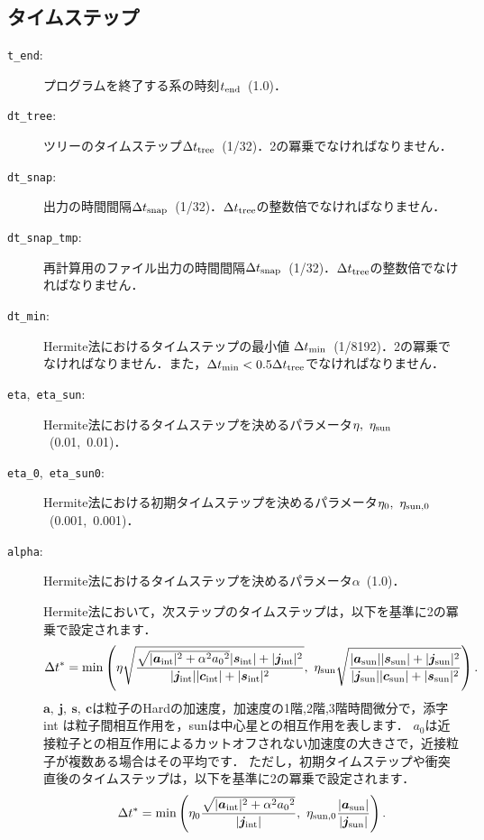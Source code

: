 \documentclass[12pt,a4paper,dvipdfmx]{jsarticle}
\begin{document}
\subsection{タイムステップ\label{timestep}}
\begin{description}
\item[\texttt{t\_end}:]
プログラムを終了する系の時刻$t_{\rm end}$\ (1.0)．
\item[\texttt{dt\_tree}:]
ツリーのタイムステップ$\Delta t_{\rm tree}$\ (1/32)．2の冪乗でなければなりません．
\item[\texttt{dt\_snap}:]
出力の時間間隔$\Delta t_{\rm snap}$\ (1/32)．$\Delta t_{\rm tree}$の整数倍でなければなりません．
\item[\texttt{dt\_snap\_tmp}:]
再計算用のファイル出力の時間間隔$\Delta t_{\rm snap}$\ (1/32)．$\Delta t_{\rm tree}$の整数倍でなければなりません．
\item[\texttt{dt\_min}:]
Hermite法におけるタイムステップの最小値$\ \Delta t_{\rm min}$\ (1/8192)．2の冪乗でなければなりません．また，$\Delta t_{\rm min}<0.5\Delta t_{\rm tree}$でなければなりません．
\item[\texttt{eta},\ \texttt{eta\_sun}:]
Hermite法におけるタイムステップを決めるパラメータ$\eta,\ \eta_{\rm sun}$\ (0.01,\ 0.01)．
\item[\texttt{eta\_0},\ \texttt{eta\_sun0}:]
Hermite法における初期タイムステップを決めるパラメータ$\eta_{0},\ \eta_{\rm sun, 0}$\ (0.001,\ 0.001)．
\item[\texttt{alpha}:]
Hermite法におけるタイムステップを決めるパラメータ$\alpha$\ (1.0)．

Hermite法において，次ステップのタイムステップは，以下を基準に2の冪乗で設定されます．
\begin{equation}
\Delta t^{*} = \min\left(
\eta\sqrt{\frac{\sqrt{|\bm{a}_{\rm int}|^{2}+\alpha^{2}{a_{0}}^{2}}|\bm{s}_{\rm int}|+|\bm{j}_{\rm int}|^{2}}{|\bm{j}_{\rm int}||\bm{c}_{\rm int}|+|\bm{s}_{\rm int}|^{2}}},\ 
\eta_{\rm sun}\sqrt{\frac{|\bm{a}_{\rm sun}||\bm{s}_{\rm sun}|+|\bm{j}_{\rm sun}|^{2}}{|\bm{j}_{\rm sun}||\bm{c}_{\rm sun}|+|\bm{s}_{\rm sun}|^{2}}}
\right).
\end{equation}
$\bm{a},\ \bm{j},\ \bm{s},\ \bm{c}$は粒子のHardの加速度，加速度の1階,2階,3階時間微分で，添字 int は粒子間相互作用を，sunは中心星との相互作用を表します．
$a_{0}$は近接粒子との相互作用によるカットオフされない加速度の大きさで，近接粒子が複数ある場合はその平均です．
ただし，初期タイムステップや衝突直後のタイムステップは，以下を基準に2の冪乗で設定されます．
\begin{equation}
\Delta t^{*} = \min\left(
\eta_{0}\frac{\sqrt{|\bm{a}_{\rm int}|^{2}+\alpha^{2}{a_{0}}^{2}}}{|\bm{j}_{\rm int}|},\ 
\eta_{\rm sun, 0}\frac{|\bm{a}_{\rm sun}|}{|\bm{j}_{\rm sun}|}
\right).
\end{equation}


\end{description}
\end{document}
